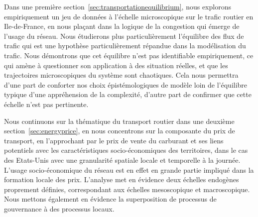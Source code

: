 Dans une première section~\ref{sec:transportationequilibrium}, nous explorons empiriquement un jeu de données à l'échelle microscopique sur le trafic routier en Ile-de-France, en nous plaçant dans la logique de la congestion qui émerge de l'usage du réseau. Nous étudierons plus particulièrement l'équilibre des flux de trafic qui est une hypothèse particulièrement répandue dans la modélisation du trafic. Nous démontrons que cet équilibre n'est pas identifiable empiriquement, ce qui amène à questionner son application à des situation réelles, et que les trajectoires microscopiques du système sont chaotiques. Cela nous permettra d'une part de conforter nos choix épistémologiques de modèle loin de l'équilibre typique d'une appréhension de la complexité, d'autre part de confirmer que cette échelle n'est pas pertinente.

Nous continuons sur la thématique du transport routier dans une deuxième section~\ref{sec:energyprice}, en nous concentrons sur la composante du prix de transport, en l'approchant par le prix de vente du carburant et ses liens potentiels avec les caractéristiques socio-économiques des territoires, dans le cas des Etats-Unis avec une granularité spatiale locale et temporelle à la journée. L'usage socio-économique du réseau est en effet en grande partie impliqué dans la formation locale des prix. L'analyse met en évidence deux échelles endogènes proprement définies, correspondant aux échelles mesoscopique et macroscopique. Nous mettons également en évidence la superposition de processus de gouvernance à des processus locaux.


\stars











